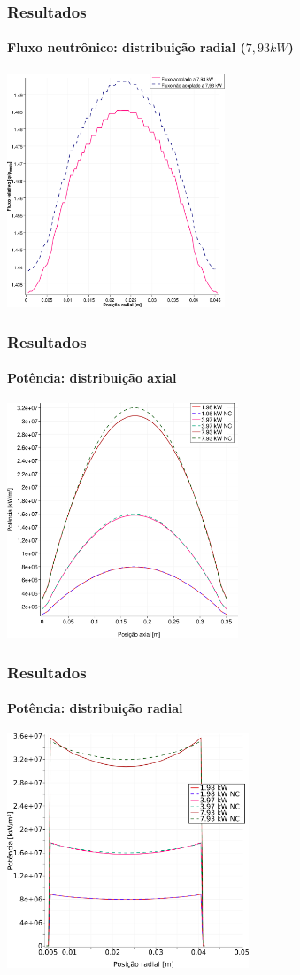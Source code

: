 \documentclass[svgnames,smaller,table]{beamer}
\begin{document}
\begin{frame}
  \frametitle{Resultados}
  \framesubtitle{Fluxo neutrônico: distribuição radial ($7,93 kW$)}
  \centering\includegraphics[width=\textwidth, height=7.0cm]{../figuras/Flux_rel_x_200_port.png}
  \label{fig:flux200x}
\end{frame}

\begin{frame}
  \frametitle{Resultados}
  \framesubtitle{Potência: distribuição axial}
  \centering\includegraphics[width=\textwidth, height=7.0cm]{../figuras/Q_all_z_square_port.png}
  \label{fig:keff50}
\end{frame}

\begin{frame}
  \frametitle{Resultados}
  \framesubtitle{Potência: distribuição radial}
  \centering\includegraphics[width=\textwidth, height=7.0cm]{../figuras/Q_all_x_square_port.png}
  \label{fig:keff50}
\end{frame}
\end{document}
